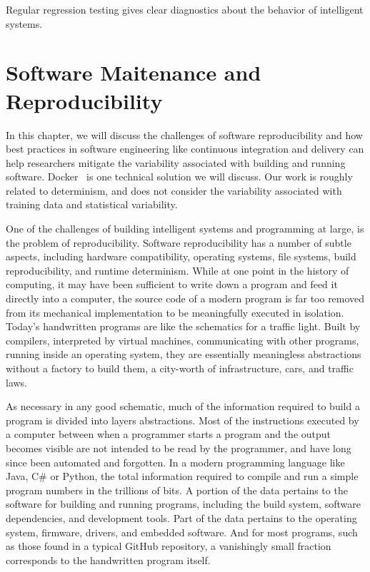 \documentclass[12pt,initial,twoside,maitrise]{dms}
\numberwithin{equation}{section}
\numberwithin{table}{chapter}
\numberwithin{figure}{chapter}
\begin{document}
Regular regression testing gives clear diagnostics about the behavior of intelligent systems.

\chapter{Software Maitenance and Reproducibility}\label{ch:software-reproducibility}

In this chapter, we will discuss the challenges of software reproducibility and how best practices in software engineering like continuous integration and delivery can help researchers mitigate the variability associated with building and running software. Docker~\cite{merkel2014docker} is one technical solution we will discuss. Our work is roughly related to determinism, and does not consider the variability associated with training data and statistical variability.

One of the challenges of building intelligent systems and programming at large, is the problem of reproducibility. Software reproducibility has a number of subtle aspects, including hardware compatibility, operating systems, file systems, build reproducibility, and runtime determinism. While at one point in the history of computing, it may have been sufficient to write down a program and feed it directly into a computer, the source code of a modern program is far too removed from its mechanical implementation to be meaningfully executed in isolation. Today's handwritten programs are like the schematics for a traffic light. Built by compilers, interpreted by virtual machines, communicating with other programs, running inside an operating system, they are essentially meaningless abstractions without a factory to build them, a city-worth of infrastructure, cars, and traffic laws.

As necessary in any good schematic, much of the information required to build a program is divided into layers abstractions. Most of the instructions executed by a computer between when a programmer starts a program and the output becomes visible are not intended to be read by the programmer, and have long since been automated and forgotten. In a modern programming language like Java, C\# or Python, the total information required to compile and run a simple program numbers in the trillions of bits. A portion of the data pertains to the software for building and running programs, including the build system, software dependencies, and development tools. Part of the data pertains to the operating system, firmware, drivers, and embedded software. And for most programs, such as those found in a typical GitHub repository, a vanishingly small fraction corresponds to the handwritten program itself.
\end{document}
